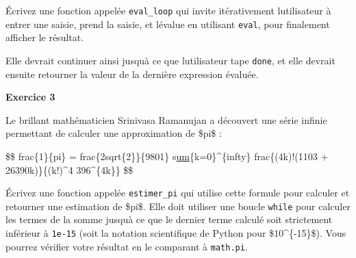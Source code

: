 Écrivez une fonction appelée \texttt{eval\_loop} qui invite
itérativement l\textquotesingle utilisateur à entrer une saisie, prend
la saisie, et l\textquotesingle évalue en utilisant \texttt{eval}, pour
finalement afficher le résultat.

Elle devrait continuer ainsi jusqu\textquotesingle à ce que
l\textquotesingle utilisateur tape
\texttt{\textquotesingle{}done\textquotesingle{}}, et elle devrait
ensuite retourner la valeur de la dernière expression évaluée.

\textbf{Exercice 3}

Le brillant mathématicien Srinivasa Ramanujan a découvert une série
infinie permettant de calculer une approximation de \$pi\$ :

\$\$ frac\{1\}\{pi\} = frac\{2sqrt\{2\}\}\{9801\}
s\href{}{um}\{k=0\}\^{}\{infty\} frac\{(4k)!(1103 + 26390k)\}\{(k!)\^{}4
396\^{}\{4k\}\} \$\$

Écrivez une fonction appelée \texttt{estimer\_pi} qui utilise cette
formule pour calculer et retourner une estimation de \$pi\$. Elle doit
utiliser une boucle \texttt{while} pour calculer les termes de la somme
jusqu\textquotesingle à ce que le dernier terme calculé soit strictement
inférieur à \texttt{1e-15} (soit la notation scientifique de Python pour
\$10\^{}\{-15\}\$). Vous pourrez vérifier votre résultat en le comparant
à \texttt{math.pi}.
